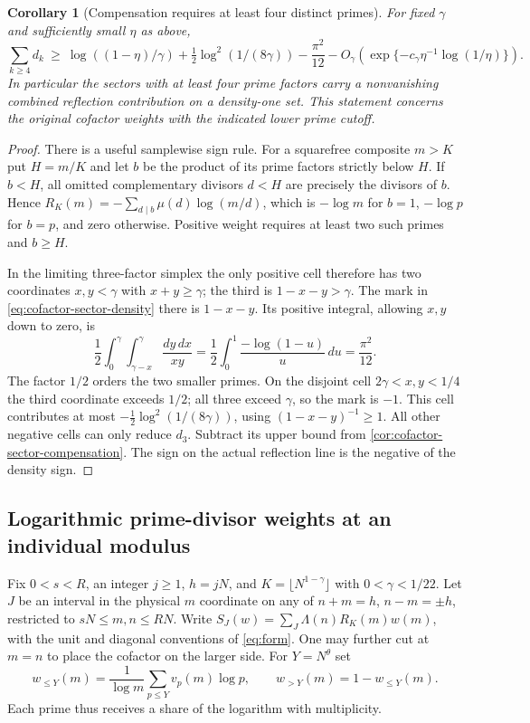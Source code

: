 \documentclass[11pt,a4paper]{article}
\numberwithin{equation}{section}
\newtheorem{corollary}[theorem]{Corollary}
\begin{document}
\begin{corollary}[Compensation requires at least four distinct primes]
\label{cor:four-factor-compensation}
For fixed $\gamma$ and sufficiently small $\eta$ as above,
\[
 \sum_{k\ge4}d_k\ \ge\
 \log((1-\eta)/\gamma)+\tfrac12\log^2(1/(8\gamma))
       -\frac{\pi^2}{12}
       -O_\gamma(\exp\{-c_\gamma\eta^{-1}\log(1/\eta)\}).
\]
In particular the sectors with at least four prime factors
carry a nonvanishing combined reflection contribution on a
density-one set. This statement concerns the original cofactor
weights with the indicated lower prime cutoff.
\end{corollary}

\begin{proof}
There is a useful samplewise sign rule. For a squarefree
composite $m>K$ put $H=m/K$ and let $b$ be the product of
its prime factors strictly below $H$. If $b<H$, all omitted
complementary divisors $d<H$ are precisely the divisors of
$b$. Hence $R_K(m)=-\sum_{d\mid b}\mu(d)\log(m/d)$, which is
$-\log m$ for $b=1$, $-\log p$ for $b=p$, and zero otherwise.
Positive weight requires at least two such primes and $b\ge H$.

In the limiting three-factor simplex the only positive cell
therefore has two coordinates $x,y<\gamma$ with $x+y\ge\gamma$;
the third is $1-x-y>\gamma$. The mark in
\eqref{eq:cofactor-sector-density} there is $1-x-y$.
Its positive integral, allowing $x,y$ down to zero, is
\[
 \frac12\int_0^\gamma\int_{\gamma-x}^\gamma
           \frac{dy\,dx}{xy}
   =\frac12\int_0^1\frac{-\log(1-u)}u\,du=\frac{\pi^2}{12}.
\]
The factor $1/2$ orders the two smaller primes. On the disjoint
cell $2\gamma<x,y<1/4$ the third coordinate exceeds $1/2$;
all three exceed $\gamma$, so the mark is $-1$. This cell
contributes at most $-\tfrac12\log^2(1/(8\gamma))$, using
$(1-x-y)^{-1}\ge1$. All other negative cells can only reduce
$d_3$. Subtract its upper bound from
\cref{cor:cofactor-sector-compensation}. The sign on the actual
reflection line is the negative of the density sign.
\end{proof}

\subsection{Logarithmic prime-divisor weights at an individual modulus}

Fix $0<s<R$, an integer $j\ge1$, $h=jN$, and
$K=\lfloor N^{1-\gamma}\rfloor$ with $0<\gamma<1/22$.
Let $J$ be an interval in the physical $m$ coordinate on any
of $n+m=h$, $n-m=\pm h$, restricted to $sN\le m,n\le RN$.
Write $S_J(w)=\sum_J\Lambda(n)R_K(m)w(m)$, with the unit and
diagonal conventions of \eqref{eq:form}. One may further cut at
$m=n$ to place the cofactor on the larger side. For $Y=N^\theta$ set
\[
 w_{\le Y}(m)=\frac1{\log m}\sum_{p\le Y}v_p(m)\log p,
 \qquad w_{>Y}(m)=1-w_{\le Y}(m).
\]
Each prime thus receives a share of the logarithm with multiplicity.
\end{document}
